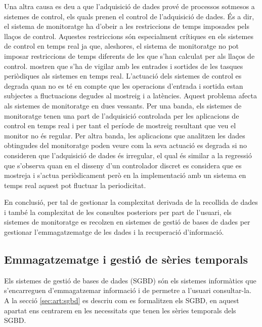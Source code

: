 Una altra causa es deu a que l'adquisició de dades prové de processos sotmesos a sistemes de control, els quals prenen el control de l'adquisició de dades. És a dir, el sistema de monitoratge ha d'obeir a les restriccions de temps imposades pels llaços de control. Aquestes restriccions són especialment crítiques en els sistemes de control en temps real ja que, aleshores, el sistema de monitoratge no pot imposar restriccions de temps diferents de les que s'han calculat per als llaços de control.  \textcite{lozoya08} mostren que s'ha de vigilar amb les entrades i sortides de les tasques periòdiques als sistemes en temps real. L'actuació dels sistemes de control es degrada quan no es té en compte que les operacions d'entrada i sortida estan subjectes a fluctuacions degudes al mostreig i a latències. Aquest problema afecta als sistemes de monitoratge en dues vessants.
Per una banda, els sistemes de monitoratge tenen una part de l'adquisició controlada per les aplicacions de control en temps real i per tant el període de mostreig resultant que veu el monitor no és regular. 
Per altra banda, les aplicacions que analitzen les dades obtingudes del monitoratge poden veure com la seva actuació es degrada si no consideren que l'adquisició de dades és irregular, el qual és similar a la regressió que s'observa \parencite{lozoya08} quan en el disseny d'un controlador discret es considera que es mostreja i s'actua periòdicament però en la implementació amb un sistema en temps real aquest pot fluctuar la periodicitat.




En conclusió, per tal de gestionar la complexitat derivada de la recollida de dades i també la complexitat de les consultes posteriors per part de l'usuari, els sistemes de monitoratge es recolzen en sistemes de gestió de bases de dades per gestionar l'emmagatzematge de les dades i la recuperació d'informació.




\subsection{Emmagatzematge i gestió de sèries temporals}


Els sistemes de gestió de bases de dades (SGBD) són els sistemes informàtics que s'encarreguen d'emmagatzemar informació i de permetre a l'usuari consultar-la. A la secció \ref{sec:art:sgbd} es descriu com es formalitzen els SGBD, en aquest apartat ens centrarem en les necessitats que tenen les sèries temporals dels SGBD.


